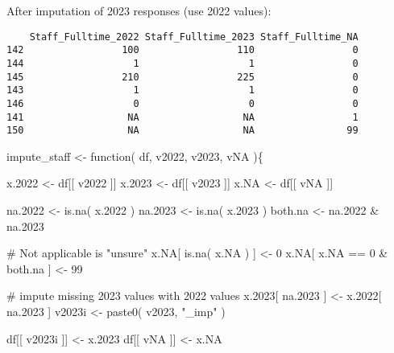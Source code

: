 \documentclass[
  letterpaper,
]{scrbook}
\newenvironment{Shaded}{\begin{snugshade}}{\end{snugshade}}
\newcommand{\CommentTok}[1]{\textcolor[rgb]{0.37,0.37,0.37}{#1}}
\newcommand{\ControlFlowTok}[1]{\textcolor[rgb]{0.00,0.23,0.31}{#1}}
\newcommand{\DecValTok}[1]{\textcolor[rgb]{0.68,0.00,0.00}{#1}}
\newcommand{\FloatTok}[1]{\textcolor[rgb]{0.68,0.00,0.00}{#1}}
\newcommand{\FunctionTok}[1]{\textcolor[rgb]{0.28,0.35,0.67}{#1}}
\newcommand{\NormalTok}[1]{\textcolor[rgb]{0.00,0.23,0.31}{#1}}
\newcommand{\OtherTok}[1]{\textcolor[rgb]{0.00,0.23,0.31}{#1}}
\newcommand{\SpecialCharTok}[1]{\textcolor[rgb]{0.37,0.37,0.37}{#1}}
\newcommand{\StringTok}[1]{\textcolor[rgb]{0.13,0.47,0.30}{#1}}
\begin{document}
After imputation of 2023 responses (use 2022 values):

\begin{verbatim}
    Staff_Fulltime_2022 Staff_Fulltime_2023 Staff_Fulltime_NA
142                 100                 110                 0
144                   1                   1                 0
145                 210                 225                 0
143                   1                   1                 0
146                   0                   0                 0
141                  NA                  NA                 1
150                  NA                  NA                99
\end{verbatim}

\begin{Shaded}
\begin{Highlighting}[]
\NormalTok{impute\_staff }\OtherTok{\textless{}{-}} \ControlFlowTok{function}\NormalTok{( df, v2022, v2023, vNA )\{}
  
\NormalTok{  x}\FloatTok{.2022} \OtherTok{\textless{}{-}}\NormalTok{ df[[ v2022 ]]}
\NormalTok{  x}\FloatTok{.2023} \OtherTok{\textless{}{-}}\NormalTok{ df[[ v2023 ]]}
\NormalTok{  x.NA   }\OtherTok{\textless{}{-}}\NormalTok{ df[[ vNA   ]]}
  
\NormalTok{  na}\FloatTok{.2022} \OtherTok{\textless{}{-}} \FunctionTok{is.na}\NormalTok{( x}\FloatTok{.2022}\NormalTok{ )}
\NormalTok{  na}\FloatTok{.2023} \OtherTok{\textless{}{-}} \FunctionTok{is.na}\NormalTok{( x}\FloatTok{.2023}\NormalTok{ )}
\NormalTok{  both.na }\OtherTok{\textless{}{-}}\NormalTok{ na}\FloatTok{.2022} \SpecialCharTok{\&}\NormalTok{ na}\FloatTok{.2023}
  
  \CommentTok{\# Not applicable is "unsure"}
\NormalTok{  x.NA[ }\FunctionTok{is.na}\NormalTok{( x.NA ) ] }\OtherTok{\textless{}{-}} \DecValTok{0}
\NormalTok{  x.NA[ x.NA }\SpecialCharTok{==} \DecValTok{0} \SpecialCharTok{\&}\NormalTok{ both.na ] }\OtherTok{\textless{}{-}} \DecValTok{99}
  
  \CommentTok{\# impute missing 2023 values with 2022 values }
\NormalTok{  x}\FloatTok{.2023}\NormalTok{[ na}\FloatTok{.2023}\NormalTok{ ] }\OtherTok{\textless{}{-}}\NormalTok{ x}\FloatTok{.2022}\NormalTok{[ na}\FloatTok{.2023}\NormalTok{ ]}
\NormalTok{  v2023i }\OtherTok{\textless{}{-}} \FunctionTok{paste0}\NormalTok{( v2023, }\StringTok{"\_imp"}\NormalTok{ )}
  
\NormalTok{  df[[ v2023i ]] }\OtherTok{\textless{}{-}}\NormalTok{ x}\FloatTok{.2023}
\NormalTok{  df[[   vNA ]] }\OtherTok{\textless{}{-}}\NormalTok{ x.NA}
  

\end{Highlighting}
\end{Shaded}
\end{document}
